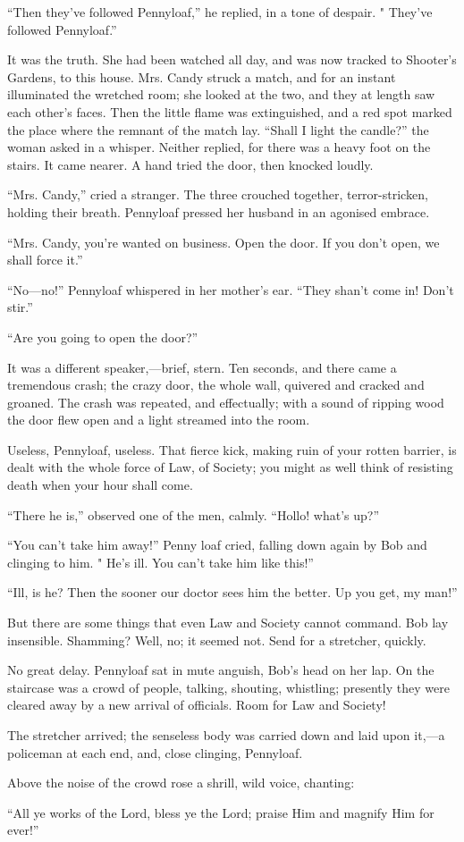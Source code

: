``Then they've followed Pennyloaf,'' he replied, in a tone of despair. "
They've followed Pennyloaf.''

It was the truth. She had been watched all day, and was now tracked to
Shooter's Gardens, to this house. Mrs. Candy struck a match, and for an
instant illuminated the wretched room; she looked at the two, and they
at length saw each other's faces. Then the little flame was
extinguished, and a red spot marked the place where the remnant of the
match lay. {\protect\hypertarget{215}{}{}}``Shall I light the candle?''
the woman asked in a whisper. Neither replied, for there was a heavy
foot on the stairs. It came nearer. A hand tried the door, then knocked
loudly.

``Mrs. Candy,'' cried a stranger. The three crouched together,
terror-stricken, holding their breath. Pennyloaf pressed her husband in
an agonised embrace.

``Mrs. Candy, you're wanted on business. Open the door. If you don't
open, we shall force it.''

``No---no!'' Pennyloaf whispered in her mother's ear. ``They shan't come
in! Don't stir.''

``Are you going to open the door?''

It was a different speaker,---brief, stern. Ten seconds, and there came
a tremendous crash; the crazy door, the whole wall, quivered and cracked
and groaned. The crash was repeated, and effectually; with a sound of
ripping wood the door flew open and a light streamed into the room.

Useless, Pennyloaf, useless. That fierce kick, making ruin of your
rotten barrier, is dealt with the whole force of Law, of Society;
{\protect\hypertarget{216}{}{}}you might as well think of resisting
death when your hour shall come.

``There he is,'' observed one of the men, calmly. ``Hollo! what's up?''

``You can't take him away!'' Penny loaf cried, falling down again by Bob
and clinging to him. " He's ill. You can't take him like this!''

``Ill, is he? Then the sooner our doctor sees him the better. Up you
get, my man!''

But there are some things that even Law and Society cannot command. Bob
lay insensible. Shamming? Well, no; it seemed not. Send for a stretcher,
quickly.

No great delay. Pennyloaf sat in mute anguish, Bob's head on her lap. On
the staircase was a crowd of people, talking, shouting, whistling;
presently they were cleared away by a new arrival of officials. Room for
Law and Society!

The stretcher arrived; the senseless body was carried down and laid upon
it,---a policeman at each end, and, close clinging, Pennyloaf.

Above the noise of the crowd rose a shrill, wild voice, chanting:

``All ye works of the Lord, bless ye the Lord; praise Him and magnify
Him for ever!''
